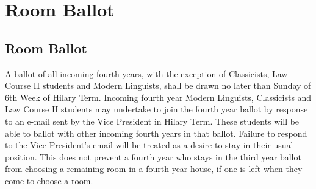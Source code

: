 \chapter{Room Ballot}\label{App:RoomBallot}

\section{Room Ballot}

\npara A ballot of all incoming fourth years, with the exception of Classicists, Law Course II students and Modern Linguists, shall be drawn no later than Sunday of 6th Week of Hilary Term. Incoming fourth year Modern Linguists, Classicists and Law Course II students may undertake to join the fourth year ballot by response to an e-mail sent by the Vice President in Hilary Term. These students will be able to ballot with other incoming fourth years in that ballot. Failure to respond to the Vice President's email will be treated as a desire to stay in their usual position. This does not prevent a fourth year who stays in the third year ballot from choosing a remaining room in a fourth year house, if one is left when they come to choose a room.

